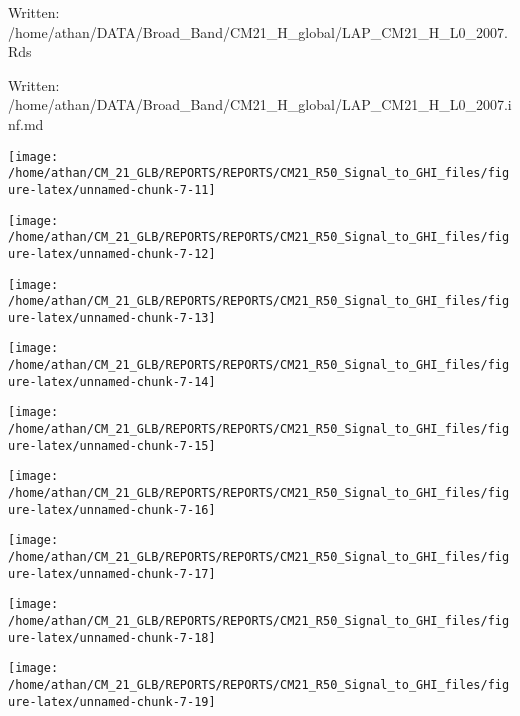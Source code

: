 \documentclass[
  11pt,
  a4paper,oneside]{article}
\begin{document}
Written: /home/athan/DATA/Broad\_Band/CM21\_H\_global/LAP\_CM21\_H\_L0\_2007.Rds

Written: /home/athan/DATA/Broad\_Band/CM21\_H\_global/LAP\_CM21\_H\_L0\_2007.inf.md

\begin{center}\texttt{[image: /home/athan/CM\_21\_GLB/REPORTS/REPORTS/CM21\_R50\_Signal\_to\_GHI\_files/figure-latex/unnamed-chunk-7-11]} \end{center}

\begin{center}\texttt{[image: /home/athan/CM\_21\_GLB/REPORTS/REPORTS/CM21\_R50\_Signal\_to\_GHI\_files/figure-latex/unnamed-chunk-7-12]} \end{center}

\begin{center}\texttt{[image: /home/athan/CM\_21\_GLB/REPORTS/REPORTS/CM21\_R50\_Signal\_to\_GHI\_files/figure-latex/unnamed-chunk-7-13]} \end{center}

\begin{center}\texttt{[image: /home/athan/CM\_21\_GLB/REPORTS/REPORTS/CM21\_R50\_Signal\_to\_GHI\_files/figure-latex/unnamed-chunk-7-14]} \end{center}

\begin{center}\texttt{[image: /home/athan/CM\_21\_GLB/REPORTS/REPORTS/CM21\_R50\_Signal\_to\_GHI\_files/figure-latex/unnamed-chunk-7-15]} \end{center}

\begin{center}\texttt{[image: /home/athan/CM\_21\_GLB/REPORTS/REPORTS/CM21\_R50\_Signal\_to\_GHI\_files/figure-latex/unnamed-chunk-7-16]} \end{center}

\begin{center}\texttt{[image: /home/athan/CM\_21\_GLB/REPORTS/REPORTS/CM21\_R50\_Signal\_to\_GHI\_files/figure-latex/unnamed-chunk-7-17]} \end{center}

\begin{center}\texttt{[image: /home/athan/CM\_21\_GLB/REPORTS/REPORTS/CM21\_R50\_Signal\_to\_GHI\_files/figure-latex/unnamed-chunk-7-18]} \end{center}

\begin{center}\texttt{[image: /home/athan/CM\_21\_GLB/REPORTS/REPORTS/CM21\_R50\_Signal\_to\_GHI\_files/figure-latex/unnamed-chunk-7-19]} \end{center}
\end{document}

